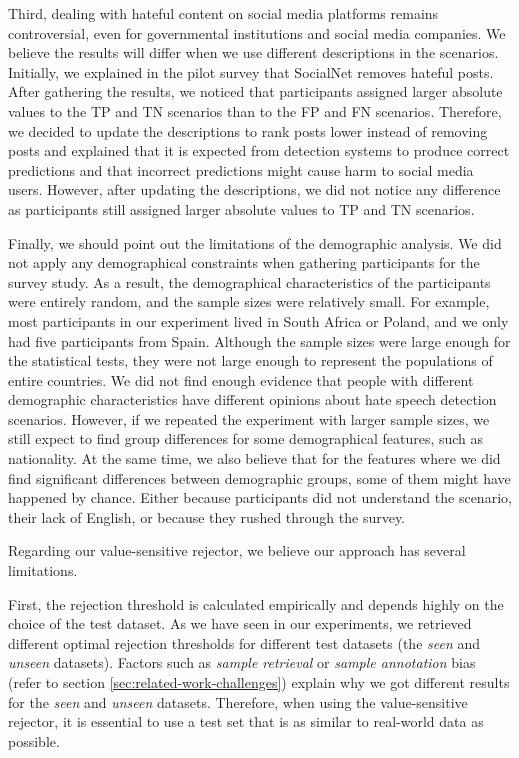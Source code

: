 %
Third, dealing with hateful content on social media platforms remains controversial, even for governmental institutions and social media companies.
%
We believe the results will differ when we use different descriptions in the scenarios.
%
Initially, we explained in the pilot survey that SocialNet removes hateful posts.
%
After gathering the results, we noticed that participants assigned larger absolute values to the TP and TN scenarios than to the FP and FN scenarios.
%
Therefore, we decided to update the descriptions to rank posts lower instead of removing posts and explained that it is expected from detection systems to produce correct predictions and that incorrect predictions might cause harm to social media users.
%
However, after updating the descriptions, we did not notice any difference as participants still assigned larger absolute values to TP and TN scenarios.
%

%
Finally, we should point out the limitations of the demographic analysis.
%
We did not apply any demographical constraints when gathering participants for the survey study.
%
As a result, the demographical characteristics of the participants were entirely random, and the sample sizes were relatively small.
%
For example, most participants in our experiment lived in South Africa or Poland, and we only had five participants from Spain.
%
Although the sample sizes were large enough for the statistical tests, they were not large enough to represent the populations of entire countries.
%
We did not find enough evidence that people with different demographic characteristics have different opinions about hate speech detection scenarios.
%
However, if we repeated the experiment with larger sample sizes, we still expect to find group differences for some demographical features, such as nationality.
%
At the same time, we also believe that for the features where we did find significant differences between demographic groups, some of them might have happened by chance.
%
Either because participants did not understand the scenario, their lack of English, or because they rushed through the survey.
%

%
Regarding our value-sensitive rejector, we believe our approach has several limitations.
%

%
First, the rejection threshold is calculated empirically and depends highly on the choice of the test dataset.
%
As we have seen in our experiments, we retrieved different optimal rejection thresholds for different test datasets (the \emph{seen} and \emph{unseen} datasets).
%
Factors such as \emph{sample retrieval} or \emph{sample annotation} bias (refer to section \ref{sec:related-work-challenges}) explain why we got different results for the \emph{seen} and \emph{unseen} datasets.
%
Therefore, when using the value-sensitive rejector, it is essential to use a test set that is as similar to real-world data as possible.
%

